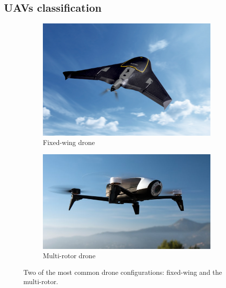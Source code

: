 \subsection{\glspl{UAV} classification}

\begin{figure}
\centering
\begin{subfigure}{.5\textwidth}
  \centering
  \includegraphics[width=.9\linewidth]{images/fixed-wings-drone.png}
  \caption{Fixed-wing drone}
  \label{fig:uav-fixed-wing}
\end{subfigure}%
\begin{subfigure}{.5\textwidth}
  \centering
  \includegraphics[width=.9\linewidth]{images/quadrotor.jpg}
  \caption{Multi-rotor drone}
  \label{fig:uav-rotor}
\end{subfigure}
\caption{ Two of the most common drone configurations: fixed-wing and the multi-rotor.}
\label{fig:uav-types}
\end{figure}

